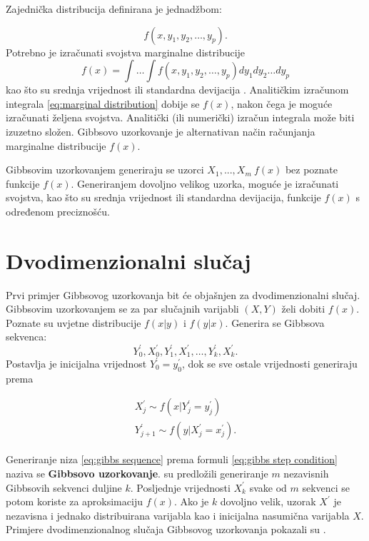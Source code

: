 Zajednička distribucija  definirana je jednadžbom:

\begin{equation} \label{eq:joint distribution}
f(x, y_1, y_2, \dots , y_p).
\end{equation}
Potrebno je izračunati svojstva marginalne distribucije 
\begin{equation} \label{eq:marginal distribution}
f(x) = \int \dots \int f(x,y_1, y_2, \dots , y_p) dy_1 dy_2 \dots dy_p
\end{equation}
kao što su srednja vrijednost  ili standardna devijacija . Analitičkim izračunom integrala \ref{eq:marginal distribution} dobije se $f(x)$, nakon čega je moguće izračunati željena svojstva. Analitički (ili numerički) izračun integrala može biti izuzetno složen. Gibbsovo uzorkovanje je alternativan način računjanja marginalne distribucije $f(x)$.

Gibbsovim uzorkovanjem generiraju se uzorci $X_1, ..., X_m ~ f(x)$ bez poznate funkcije $f(x)$. Generiranjem dovoljno velikog uzorka, moguće je izračunati svojstva, kao što su srednja vrijednost ili standardna devijacija, funkcije $f(x)$ s određenom preciznošću. 

\section{Dvodimenzionalni slučaj}

Prvi primjer Gibbsovog uzorkovanja bit će objašnjen za dvodimenzionalni slučaj. Gibbsovim uzorkovanjem se za par slučajnih varijabli $(X,Y)$ želi dobiti $f(x)$. Poznate su uvjetne distribucije $f(x|y)$ i $f(y|x)$. Generira se Gibbsova sekvenca:
\begin{equation} \label{eq:gibbs sequence}
Y_{0}^{'}, X_{0}^{'}, Y_{1}^{'}, X_{1}^{'}, \dots , Y_{k}^{'}, X_{k}^{'}. 
\end{equation}
Postavlja je inicijalna vrijednost $Y_{0}^{'} = y_{0}^{'}$, dok se sve ostale vrijednosti generiraju prema

\begin{align} \label{eq:gibbs step condition}
X_{j}^{'} \sim f(x | Y_{j}^{'}=y_{j}^{'}) \nonumber \\
Y_{j+1}^{'} \sim f(y | X_{j}^{'} = x_{j}^{'}).
\end{align}

Generiranje niza \eqref{eq:gibbs sequence} prema formuli \eqref{eq:gibbs step condition} naziva se \textbf{Gibbsovo uzorkovanje}. \citep{gelfand1990sampling} su predložili generiranje $m$ nezavisnih Gibbsovih sekvenci duljine $k$. Posljednje vrijednosti $X_{k}^{'}$ svake od $m$ sekvenci se potom koriste za aproksimaciju $f(x)$. Ako je $k$ dovoljno velik, uzorak $X^{'}$ je nezavisna i jednako distribuirana varijabla  kao i inicijalna nasumična varijabla $X$. Primjere dvodimenzionalnog slučaja Gibbsovog uzorkovanja pokazali su \citep{casella1992explaining}.

